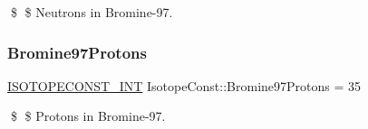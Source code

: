\$ \$ Neutrons in Bromine-\/97. \mbox{\label{group___isotope_const-_bromine-_br97_gaf2ad3b793c2c9725fee9b281a5376de7}} 
\subsubsection{\texorpdfstring{Bromine97\+Protons}{Bromine97Protons}}
{\footnotesize\ttfamily \mbox{\hyperlink{group___isotope_const-_macros_ga5f18360b3e99483a35c32d789e62621c}{I\+S\+O\+T\+O\+P\+E\+C\+O\+N\+S\+T\+\_\+\+I\+NT}} Isotope\+Const\+::\+Bromine97\+Protons = 35}

\$ \$ Protons in Bromine-\/97. 